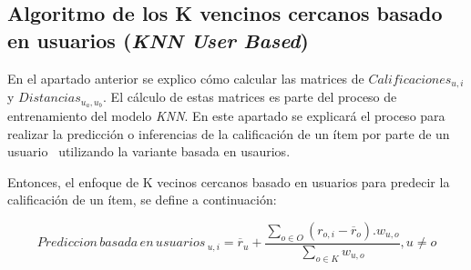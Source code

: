 \documentclass[11pt,a4paper,twoside]{thesis}
\begin{document}
\clearpage

\subsection{Algoritmo de los K vencinos cercanos basado en usuarios (\textit{KNN User Based})}

En el apartado anterior se explico cómo calcular las matrices de
$Calificaciones_{u,i}$ y $Distancias_{u_a,u_b}$. El cálculo de estas matrices
es parte del proceso de entrenamiento del modelo \textit{KNN}. En este apartado
se explicará el proceso para realizar la predicción o inferencias de la
calificación de un ítem por parte de un usuario~\cite{useritembasedinference}
utilizando la variante basada en usaurios.

Entonces, el enfoque de K vecinos cercanos basado en usuarios para predecir la
calificación de un ítem, se define a continuación:

\begin{equation}
	Prediccion \mspace{3mu}basada \mspace{3mu}en \mspace{3mu}usuarios\mspace{3mu}_{u, i} = \overline{r}_{u} + \frac{\sum_{o \in O} (r_{o, i} - \overline{r}_o) . w_{u, o} }{ \sum_{o \in K} w_{u, o}}, u \neq o
\end{equation}
\end{document}
